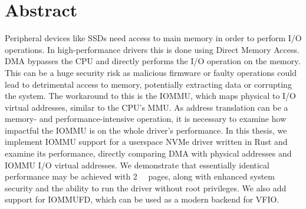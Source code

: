 \chapter{Abstract}

Peripheral devices like SSDs need access to main memory in order to perform I/O operations. In high-performance drivers this is done using Direct Memory Access. DMA bypasses the CPU and directly performs the I/O operation on the memory. This can be a huge security risk as malicious firmware or faulty operations could lead to detrimental access to memory, potentially extracting data or corrupting the system. The workaround to this is the IOMMU, which maps physical to I/O virtual addresses, similar to the CPU's MMU. As address translation can be a memory- and performance-intensive operation, it is necessary to examine how impactful the IOMMU is on the whole driver's performance.
In this thesis, we implement IOMMU support for a userspace NVMe driver written in Rust and examine its performance, directly comparing DMA with physical addresses and IOMMU I/O virtual addresses. We demonstrate that essentially identical performance may be achieved with \qty{2}{\mebi\byte} pages, along with enhanced system security and the ability to run the driver without root privileges. We also add support for IOMMUFD, which can be used as a modern backend for VFIO.